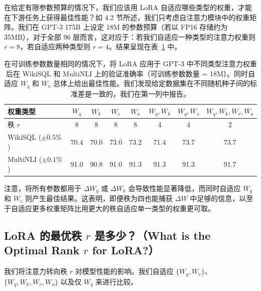 \documentclass[11pt,UTF8,fontset=fandol]{ctexart}
\begin{document}
在给定有限参数预算的情况下，我们应该用 LoRA 自适应哪些类型的权重，才能在下游任务上获得最佳性能？如 4.2 节所述，我们只考虑自注意力模块中的权重矩阵。我们在 GPT-3 175B 上设定 18M 的参数预算（若以 FP16 存储约为 35MB），对于全部 96 层而言，这对应于：若我们自适应一种类型的注意力权重则 $r=8$，若自适应两种类型则 $r=4$。结果呈现在表~\ref{tab:5} 中。

\begin{table}[H]\centering
\caption{在可训练参数数量相同的情况下，将 LoRA 应用于 GPT-3 中不同类型注意力权重后在 WikiSQL 和 MultiNLI 上的验证准确率（可训练参数数量 = 18M）。同时自适应 $W_q$ 和 $W_v$ 总体上给出最佳性能。我们发现给定数据集在不同随机种子间的标准差是一致的，我们在第一列中报告。}
\label{tab:5}
\begin{tabular}{lccccccc}
\toprule
权重类型 & $W_q$ & $W_k$ & $W_v$ & $W_o$ & $W_q, W_k$ & $W_q, W_v$ & $W_q, W_k, W_v, W_o$ \\
\midrule
秩 $r$ & 8 & 8 & 8 & 8 & 4 & 4 & 2 \\
\midrule
WikiSQL ($\pm0.5\%$) & 70.4 & 70.0 & 73.0 & 73.2 & 71.4 & 73.7 & 73.7 \\
MultiNLI ($\pm0.1\%$) & 91.0 & 90.8 & 91.0 & 91.3 & 91.3 & 91.3 & 91.7 \\
\bottomrule
\end{tabular}
\end{table}

注意，将所有参数都用于 $\Delta W_q$ 或 $\Delta W_k$ 会导致性能显著降低，而同时自适应 $W_q$ 和 $W_v$ 则产生最佳结果。这表明，即便秩为四也能捕获 $\Delta W$ 中足够的信息，以至于自适应更多权重矩阵比用更大的秩自适应单一类型的权重更可取。

\subsection{LoRA 的最优秩 $r$ 是多少？（What is the Optimal Rank $r$ for LoRA?）}

我们将注意力转向秩 $r$ 对模型性能的影响。我们自适应 $\{W_q, W_v\}$、$\{W_q, W_k, W_v, W_o\}$ 以及仅 $W_q$ 来进行比较。
\end{document}
